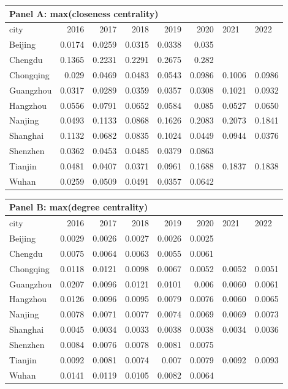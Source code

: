 
\begin{tabular}{lrrrrrll}
    \multicolumn{8}{l}{\textbf{Panel A: max(closeness centrality)}}\\
\hline
 city      &   2016 &   2017 &   2018 &   2019 &   2020 & 2021   & 2022   \\
\hline
 Beijing   & 0.0174 & 0.0259 & 0.0315 & 0.0338 & 0.035  &        &        \\
 Chengdu   & 0.1365 & 0.2231 & 0.2291 & 0.2675 & 0.282  &        &        \\
 Chongqing & 0.029  & 0.0469 & 0.0483 & 0.0543 & 0.0986 & 0.1006 & 0.0986 \\
 Guangzhou & 0.0317 & 0.0289 & 0.0359 & 0.0357 & 0.0308 & 0.1021 & 0.0932 \\
 Hangzhou  & 0.0556 & 0.0791 & 0.0652 & 0.0584 & 0.085  & 0.0527 & 0.0650 \\
 Nanjing   & 0.0493 & 0.1133 & 0.0868 & 0.1626 & 0.2083 & 0.2073 & 0.1841 \\
 Shanghai  & 0.1132 & 0.0682 & 0.0835 & 0.1024 & 0.0449 & 0.0944 & 0.0376 \\
 Shenzhen  & 0.0362 & 0.0453 & 0.0485 & 0.0379 & 0.0863 &        &        \\
 Tianjin   & 0.0481 & 0.0407 & 0.0371 & 0.0961 & 0.1688 & 0.1837 & 0.1838 \\
 Wuhan     & 0.0259 & 0.0509 & 0.0491 & 0.0357 & 0.0642 &        &        \\
\hline
\end{tabular}

\begin{tabular}{lrrrrrll}
    \multicolumn{8}{l}{\textbf{Panel B: max(degree centrality)}}\\
\hline
 city      &   2016 &   2017 &   2018 &   2019 &   2020 & 2021   & 2022   \\
\hline
 Beijing   & 0.0029 & 0.0026 & 0.0027 & 0.0026 & 0.0025 &        &        \\
 Chengdu   & 0.0075 & 0.0064 & 0.0063 & 0.0055 & 0.0061 &        &        \\
 Chongqing & 0.0118 & 0.0121 & 0.0098 & 0.0067 & 0.0052 & 0.0052 & 0.0051 \\
 Guangzhou & 0.0207 & 0.0096 & 0.0121 & 0.0101 & 0.006  & 0.0060 & 0.0061 \\
 Hangzhou  & 0.0126 & 0.0096 & 0.0095 & 0.0079 & 0.0076 & 0.0060 & 0.0065 \\
 Nanjing   & 0.0078 & 0.0071 & 0.0077 & 0.0074 & 0.0069 & 0.0069 & 0.0073 \\
 Shanghai  & 0.0045 & 0.0034 & 0.0033 & 0.0038 & 0.0038 & 0.0034 & 0.0036 \\
 Shenzhen  & 0.0084 & 0.0076 & 0.0078 & 0.0081 & 0.0075 &        &        \\
 Tianjin   & 0.0092 & 0.0081 & 0.0074 & 0.007  & 0.0079 & 0.0092 & 0.0093 \\
 Wuhan     & 0.0141 & 0.0119 & 0.0105 & 0.0082 & 0.0064 &        &        \\
\hline
\end{tabular}

